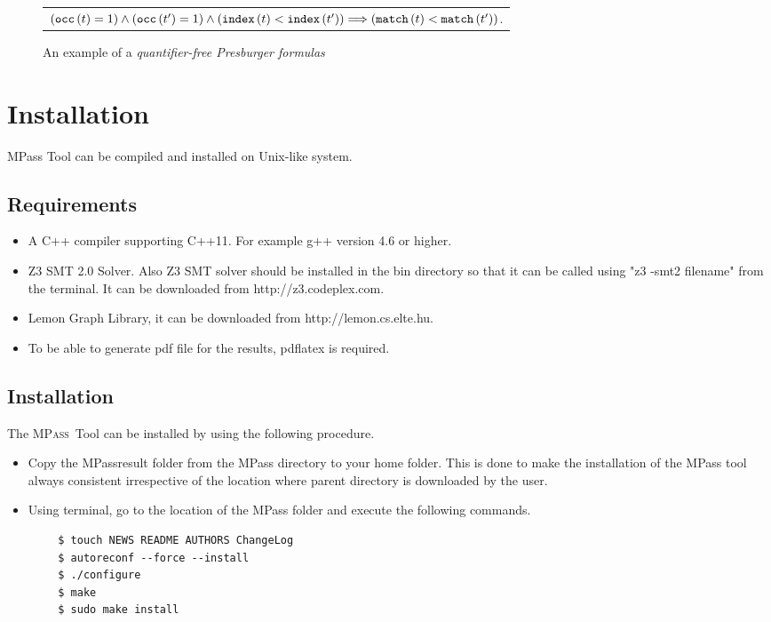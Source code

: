 \documentclass[a4paper]{article}
\newcommand{\MPass}{\textsc{MPass}}
\newcommand{\transition}{t}
\newcommand{\occvar}{{\tt occ}}
\newcommand{\occvarof}[1]{\occvar\left({#1}\right)}
\newcommand{\indexvar}{{\tt index}}
\newcommand{\indexvarof}[1]{\indexvar\left({#1}\right)}
\newcommand{\matchingvar}{{\tt match}}
\newcommand{\matchingvarof}[1]{\matchingvar\left({#1}\right)}
\newcommand{\implies}{\Longrightarrow}
\begin{document}
\begin{figure}[h]
\begin{center}
\begin{tabular}{l@{\hspace{20pt}}}
$
\left(\occvarof{\transition}=1\right)
\wedge
\left(\occvarof{\transition'}=1\right)
\wedge
\left(\indexvarof{\transition}<\indexvarof{\transition'}\right)
\implies
\left(\matchingvarof{\transition}<\matchingvarof{\transition'}\right)
$.
\end{tabular}
\end{center}
\caption{An example of a \emph{quantifier-free Presburger formulas}}\label{fig:examples}
\end{figure}

\section{Installation}
MPass Tool can be compiled and installed on Unix-like system.
\subsection{Requirements}
\begin{itemize}
    \item A C++ compiler supporting C++11. For example g++ version 4.6 or higher.

    \item Z3 SMT 2.0 Solver. Also Z3 SMT solver should be installed in the bin directory so 
       that it can be called using "z3 -smt2 filename" from the terminal.
       It can be downloaded from http://z3.codeplex.com.

    \item Lemon Graph Library, it can be downloaded from http://lemon.cs.elte.hu.

    \item To be able to generate pdf file for the results, pdflatex is required.
\end{itemize}

\subsection{Installation}
The \MPass\ Tool can be installed by using the following procedure.
\begin{itemize}
    \item Copy the MPass\textunderscore result folder from the MPass directory to your home folder. This is done to make the installation of the MPass tool always consistent irrespective of the location where parent directory is downloaded by the user.
    \item Using terminal, go to the location of the MPass folder and execute the following commands.
\end{itemize}
\begin{Verbatim}
        $ touch NEWS README AUTHORS ChangeLog
        $ autoreconf --force --install
        $ ./configure
        $ make
        $ sudo make install
\end{Verbatim}
\end{document}
